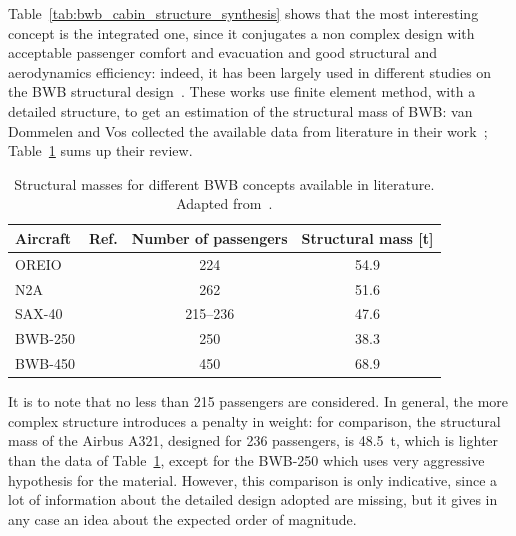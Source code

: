 Table~\ref{tab:bwb_cabin_structure_synthesis} shows that the most interesting concept is the integrated one, since it conjugates a non complex design with acceptable passenger comfort and evacuation and good structural and aerodynamics efficiency: indeed, it has been largely used in different studies on the BWB structural design~\cite{bib:pitera, bib:kawai, bib:hileman_bwb, bib:bradley_bwb, bib:cheng}. 
These works use finite element method, with a detailed structure, to get an estimation of the structural mass of BWB: van Dommelen and Vos collected the available data from literature in their work~\cite{bib:van_dommelen}; Table~\ref{tab:bwb_struc_masses} sums up their review. 
\begin{table}
	\centering
	\begin{tabular}{l c c c}
		\hline
		\textbf{Aircraft} & \textbf{Ref.} & \textbf{Number of passengers} & \textbf{Structural mass [t]} \\
		\hline
		OREIO & \cite{bib:pitera} & 224 & 54.9 \\
		N2A & \cite{bib:kawai} & 262 & 51.6 \\
		SAX-40 & \cite{bib:hileman_bwb} & 215--236 & 47.6 \\
		BWB-250 & \cite{bib:bradley_bwb} & 250 & 38.3 \\
		BWB-450 & \cite{bib:bradley_bwb} & 450 & 68.9 \\
		\hline
	\end{tabular}
	\caption{Structural masses for different BWB concepts available in literature. Adapted from~\cite{bib:van_dommelen}.}
	\label{tab:bwb_struc_masses}
\end{table}
It is to note that no less than 215 passengers are considered. 
In general, the more complex structure introduces a penalty in weight: for comparison, the structural mass of the Airbus A321, designed for 236 passengers, is 48.5~\si{\tonne}, which is lighter than the data of Table~\ref{tab:bwb_struc_masses}, except for the BWB-250 which uses very aggressive hypothesis for the material. 
However, this comparison is only indicative, since a lot of information about the detailed design adopted are missing, but it gives in any case an idea about the expected order of magnitude. 

